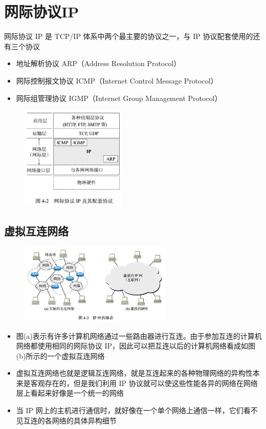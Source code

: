 \documentclass[cs4size,a4paper,10pt]{ctexart}
\begin{document}
	\section{网际协议IP}
	网际协议 IP 是 TCP/IP 体系中两个最主要的协议之一，与 IP 协议配套使用的还有三个协议
	\begin{itemize}
		\item 地址解析协议 ARP（Address Resolution Protocol）
		\item 网际控制报文协议 ICMP（Internet Control Message Protocol）
		\item 网际组管理协议 IGMP（Internet Group Management Protocol）
	\end{itemize}

	\begin{figure}[H]
		\centering
		\includegraphics[width=0.45\textwidth]{img/4.2}
	\end{figure}

	\subsection{虚拟互连网络}
	\begin{figure}[H]
		\centering
		\includegraphics[width=0.65\textwidth]{img/4.3}
	\end{figure}
	\begin{itemize}
		\item 图(a)表示有许多计算机网络通过一些路由器进行互连。由于参加互连的计算机网络都使用相同的网际协议 IP，因此可以把互连以后的计算机网络看成如图(b)所示的一个虚拟互连网络
		\item 虚拟互连网络也就是逻辑互连网络，就是互连起来的各种物理网络的异构性本来是客观存在的，但是我们利用 IP 协议就可以使这些性能各异的网络在网络层上看起来好像是一个统一的网络
		\item 当 IP 网上的主机进行通信时，就好像在一个单个网络上通信一样，它们看不见互连的各网络的具体异构细节
	\end{itemize}
\end{document}
